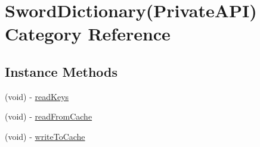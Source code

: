 \hypertarget{category_sword_dictionary_07_private_a_p_i_08}{\section{Sword\-Dictionary(Private\-A\-P\-I) Category Reference}
\label{category_sword_dictionary_07_private_a_p_i_08}
}
\subsection*{Instance Methods}
\begin{DoxyCompactItemize}
\item 
(void) -\/ \hyperlink{category_sword_dictionary_07_private_a_p_i_08_ac5fadb7881ae954770d26f6ee7fc4c72}{read\-Keys}
\item 
(void) -\/ \hyperlink{category_sword_dictionary_07_private_a_p_i_08_a418abaea1ca31947799f46e58dda26d2}{read\-From\-Cache}
\item 
(void) -\/ \hyperlink{category_sword_dictionary_07_private_a_p_i_08_ae0134de54586ecb93ecbbd10c432db62}{write\-To\-Cache}
\end{DoxyCompactItemize}



